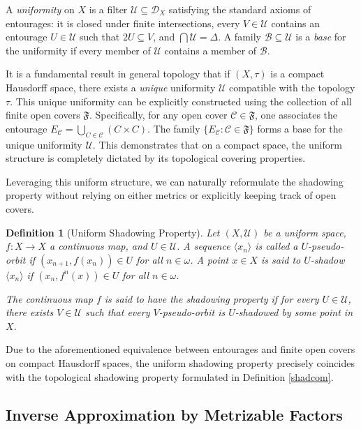 \documentclass[10pt,a4paper]{amsart}
\newtheorem{definition}[theorem]{Definition}
\numberwithin{equation}{section}
\begin{document}
A \emph{uniformity} on $X$ is a filter $\mathcal{U} \subseteq \mathcal{D}_X$ satisfying the standard axioms of entourages: it is closed under finite intersections, every $V \in \mathcal{U}$ contains an entourage $U \in \mathcal{U}$ such that $2U \subseteq V$, and $\bigcap \mathcal{U} = \Delta$. A family $\mathcal{B} \subseteq \mathcal{U}$ is a \emph{base} for the uniformity if every member of $\mathcal{U}$ contains a member of $\mathcal{B}$.

It is a fundamental result in general topology \cite[Section 8.3]{Eng} that if $(X, \tau)$ is a compact Hausdorff space, there exists a \emph{unique} uniformity $\mathcal{U}$ compatible with the topology $\tau$. This unique uniformity can be explicitly constructed using the collection of all finite open covers $\mathfrak{F}$. Specifically, for any open cover $\mathcal{C} \in \mathfrak{F}$, one associates the entourage $E_{\mathcal{C}} = \bigcup_{C \in \mathcal{C}} (C \times C)$. The family $\{ E_{\mathcal{C}} : \mathcal{C} \in \mathfrak{F} \}$ forms a base for the unique uniformity $\mathcal{U}$. This demonstrates that on a compact space, the uniform structure is completely dictated by its topological covering properties.

Leveraging this uniform structure, we can naturally reformulate the shadowing property without relying on either metrics or explicitly keeping track of open covers.

\begin{definition}[Uniform Shadowing Property]
Let $(X, \mathcal{U})$ be a uniform space, $f: X \to X$ a continuous map, and $U \in \mathcal{U}$. A sequence $\langle x_n \rangle$ is called a \emph{$U$-pseudo-orbit} if $(x_{n+1}, f(x_n)) \in U$ for all $n \in \omega$. A point $x \in X$ is said to \emph{$U$-shadow} $\langle x_n \rangle$ if $(x_n, f^n(x)) \in U$ for all $n \in \omega$. 

The continuous map $f$ is said to have the \emph{shadowing property} if for every $U \in \mathcal{U}$, there exists $V \in \mathcal{U}$ such that every $V$-pseudo-orbit is $U$-shadowed by some point in $X$.
\end{definition}

Due to the aforementioned equivalence between entourages and finite open covers on compact Hausdorff spaces, the uniform shadowing property precisely coincides with the topological shadowing property formulated in Definition \ref{shadcom}.

\subsection{Inverse Approximation by Metrizable Factors}
\end{document}
